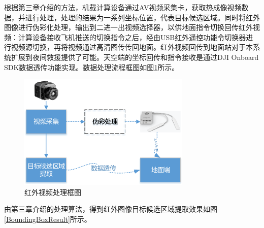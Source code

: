 根据第三章介绍的方法，机载计算设备通过AV视频采集卡，获取热成像视频数据，并进行处理，处理的结果为一系列坐标位置，代表目标候选区域。同时将红外图像进行伪彩化处理，输出到二进一出视频选择器，以供地面指令切换回传红外视频：计算设备接收飞机推送的切换指令之后，经由USB红外遥控功能令切换器进行视频源切换，再将视频通过高清图传传回地面。红外视频回传到地面站对于本系统扩展到夜间救援提供了可能。天空端的坐标回传和指令接收是通过DJI Onboard SDK数据透传功能实现。数据处理流程框图如图\ref{红外视频处理框图}所示。

\begin{figure}[h]
    \centering
    \includegraphics[height=5.5cm]{figures/红外视频处理框图.pdf}
    \caption{红外视频处理框图}\label{红外视频处理框图}
\end{figure}

由第三章介绍的处理算法，得到红外图像目标候选区域提取效果如图\ref{BoundingBoxResult}所示。
 	 
